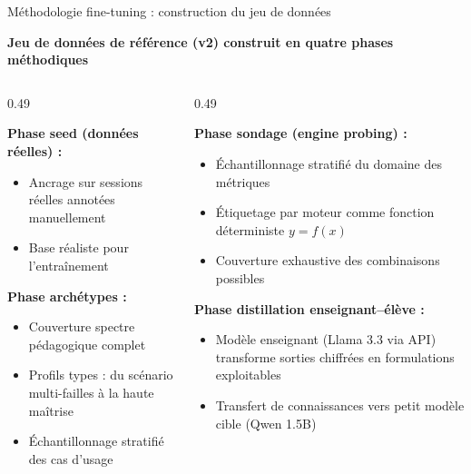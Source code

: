 \documentclass[10pt,aspectratio=169]{beamer}
\begin{document}
\begin{frame}{Méthodologie fine-tuning : construction du jeu de données}
\begin{keybox}
\textbf{Jeu de données de référence (v2) construit en quatre phases méthodiques}
\end{keybox}
\vspace{0.35cm}
\begin{columns}[T]
\begin{column}{0.49\textwidth}
\begin{tcolorbox}[title=Phases 1-2 : Ancrage et couverture, colframe=primary, colback=primary!3]
\small
\textbf{Phase seed (données réelles) :}
\begin{itemize}
    \item Ancrage sur sessions réelles annotées manuellement
    \item Base réaliste pour l'entraînement
\end{itemize}
\textbf{Phase archétypes :}
\begin{itemize}
    \item Couverture spectre pédagogique complet
    \item Profils types : du scénario multi-failles à la haute maîtrise
    \item Échantillonnage stratifié des cas d'usage
\end{itemize}
\end{tcolorbox}
\end{column}
\begin{column}{0.49\textwidth}
\begin{tcolorbox}[title=Phases 3-4 : Sondage et distillation, colframe=success, colback=success!3]
\small
\textbf{Phase sondage (engine probing) :}
\begin{itemize}
    \item Échantillonnage stratifié du domaine des métriques
    \item Étiquetage par moteur comme fonction déterministe $y = f(x)$
    \item Couverture exhaustive des combinaisons possibles
\end{itemize}
\textbf{Phase distillation enseignant--élève :}
\begin{itemize}
    \item Modèle enseignant (Llama 3.3 via API) transforme sorties chiffrées en formulations exploitables
    \item Transfert de connaissances vers petit modèle cible (Qwen 1.5B)
\end{itemize}
\end{tcolorbox}
\end{column}
\end{columns}
\end{frame}
\end{document}
